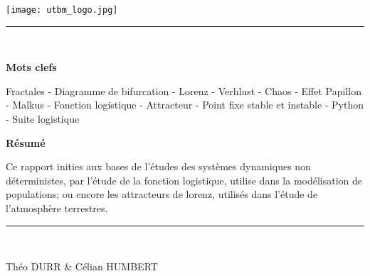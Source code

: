 \newcommand{\HRule}{\rule{\linewidth}{0.1mm}} %
\enlargethispage{2cm} %

\begin{center}
    \texttt{[image: utbm\_logo.jpg]} \\

    \HRule \\[0.6cm]
    \begin{flushleft}
        \huge\textbf{Mots clefs}
    \end{flushleft}

    Fractales - Diagramme de bifurcation - Lorenz - Verhlust - Chaos - Effet Papillon - Malkus - Fonction logistique - Attracteur - Point fixe stable et instable - Python - Suite logistique

    \vspace{1cm} 

    \begin{flushleft}
        \huge\textbf{Résumé}
    \end{flushleft}

    Ce rapport inities aux bases de l'études des systèmes dynamiques non déterministes, par l'étude de la fonction logistique, utilise dans la modélisation de populations; ou encore les attracteurs de lorenz, utilisés dans l'étude de l'atmosphère terrestres.

    \vspace{1cm} 
    \HRule \\[1.5cm]

    \vfill

    \large Théo DURR \& Célian HUMBERT

\end{center}